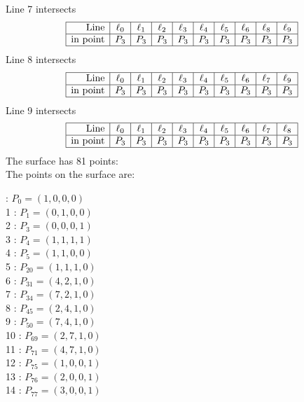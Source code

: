 \documentclass{article}
\begin{document}
{$$$$
Line 7 intersects 
$$
\begin{array}{|r*{9}{|c}|}
\hline
\mbox{Line}  & \ell_{0} & \ell_{1} & \ell_{2} & \ell_{3} & \ell_{4} & \ell_{5} & \ell_{6} & \ell_{8} & \ell_{9}\\
\hline
\mbox{in point}  & P_{3} & P_{3} & P_{3} & P_{3} & P_{3} & P_{3} & P_{3} & P_{3} & P_{3}\\
\hline
\end{array}
$$
Line 8 intersects 
$$
\begin{array}{|r*{9}{|c}|}
\hline
\mbox{Line}  & \ell_{0} & \ell_{1} & \ell_{2} & \ell_{3} & \ell_{4} & \ell_{5} & \ell_{6} & \ell_{7} & \ell_{9}\\
\hline
\mbox{in point}  & P_{3} & P_{3} & P_{3} & P_{3} & P_{3} & P_{3} & P_{3} & P_{3} & P_{3}\\
\hline
\end{array}
$$
Line 9 intersects 
$$
\begin{array}{|r*{9}{|c}|}
\hline
\mbox{Line}  & \ell_{0} & \ell_{1} & \ell_{2} & \ell_{3} & \ell_{4} & \ell_{5} & \ell_{6} & \ell_{7} & \ell_{8}\\
\hline
\mbox{in point}  & P_{3} & P_{3} & P_{3} & P_{3} & P_{3} & P_{3} & P_{3} & P_{3} & P_{3}\\
\hline
\end{array}
$$
The surface has 81 points:\\
The points on the surface are:\\
\begin{multicols}{3}
 : $P_{0}=( 1, 0, 0, 0 )$\\
1 : $P_{1}=( 0, 1, 0, 0 )$\\
2 : $P_{3}=( 0, 0, 0, 1 )$\\
3 : $P_{4}=( 1, 1, 1, 1 )$\\
4 : $P_{5}=( 1, 1, 0, 0 )$\\
5 : $P_{20}=( 1, 1, 1, 0 )$\\
6 : $P_{31}=( 4, 2, 1, 0 )$\\
7 : $P_{34}=( 7, 2, 1, 0 )$\\
8 : $P_{45}=( 2, 4, 1, 0 )$\\
9 : $P_{50}=( 7, 4, 1, 0 )$\\
10 : $P_{69}=( 2, 7, 1, 0 )$\\
11 : $P_{71}=( 4, 7, 1, 0 )$\\
12 : $P_{75}=( 1, 0, 0, 1 )$\\
13 : $P_{76}=( 2, 0, 0, 1 )$\\
14 : $P_{77}=( 3, 0, 0, 1 )$\\

\end{multicols}}
\end{document}
